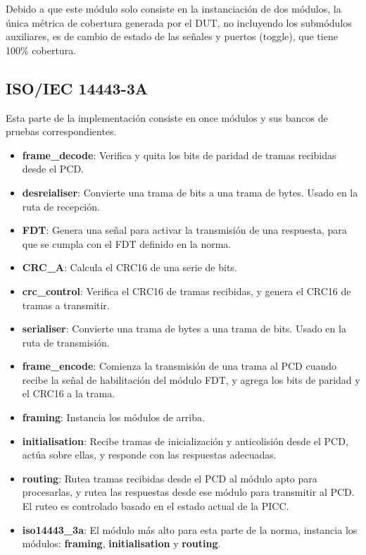 \documentclass[a4paper, twoside, 11pt]{report}
\begin{document}
Debido a que este módulo solo consiste en la instanciación de dos módulos, la única métrica de cobertura generada por el DUT, no incluyendo los submódulos auxiliares, es de cambio de estado de las señales y puertos (toggle), que tiene 100\% cobertura.

\FloatBarrier
\subsection{ISO/IEC 14443-3A}

Esta parte de la implementación consiste en once módulos y sus bancos de pruebas correspondientes.

\begin{itemize}
  \item \textbf{frame\_decode}: Verifica y quita los bits de paridad de tramas recibidas desde el PCD.
  \item \textbf{desreialiser}: Convierte una trama de bits a una trama de bytes. Usado en la ruta de recepción.
  \item \textbf{FDT}: Genera una señal para activar la transmisión de una respuesta, para que se cumpla con el FDT definido en la norma.
  \item \textbf{CRC\_A}: Calcula el CRC16 de una serie de bits.
  \item \textbf{crc\_control}: Verifica el CRC16 de tramas recibidas, y genera el CRC16 de tramas a transmitir.
  \item \textbf{serialiser}: Convierte una trama de bytes a una trama de bits. Usado en la ruta de transmisión.
  \item \textbf{frame\_encode}: Comienza la transmisión de una trama al PCD cuando recibe la señal de habilitación del módulo FDT, y agrega los bits de paridad y el CRC16 a la trama.
  \item \textbf{framing}: Instancia los módulos de arriba.
  \item \textbf{initialisation}: Recibe tramas de inicialización y anticolisión desde el PCD, actúa sobre ellas, y responde con las respuestas adecuadas.
  \item \textbf{routing}: Rutea tramas recibidas desde el PCD al módulo apto para procesarlas, y rutea las respuestas desde ese módulo para transmitir al PCD. El ruteo es controlado basado en el estado actual de la PICC.
  \item \textbf{iso14443\_3a}: El módulo más alto para esta parte de la norma, instancia los módulos: \textbf{framing}, \textbf{initialisation} y \textbf{routing}.
\end{itemize}
\end{document}
